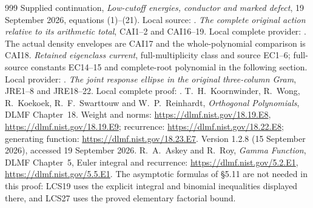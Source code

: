 \begin{thebibliography}{999}
 Supplied continuation,
\emph{Low-cutoff energies, conductor and marked defect},
19 September 2026, equations (1)--(21).
Local source: .
 \emph{The complete original action relative to its
arithmetic total}, CAI1--2 and CAI16--19. Local complete provider:
.
The actual density envelopes are CAI17 and the whole-polynomial
comparison is CAI18.
 \emph{Retained eigenclass current}, full-multiplicity
class and source EC1--6; full-source constants EC14--15 and
complete-root polynomial in the following section. Local provider:
.
 \emph{The joint response ellipse in the original
three-column Gram}, JRE1--8 and JRE18--22. Local complete proof:
.
 T.~H.~Koornwinder, R.~Wong, R.~Koekoek,
R.~F.~Swarttouw and W.~P.~Reinhardt,
\emph{Orthogonal Polynomials}, DLMF Chapter~18.
Weight and norms: \url{https://dlmf.nist.gov/18.19.E8},
\url{https://dlmf.nist.gov/18.19.E9}; recurrence:
\url{https://dlmf.nist.gov/18.22.E8}; generating function:
\url{https://dlmf.nist.gov/18.23.E7}.
Version 1.2.8 (15 September 2026), accessed 19 September 2026.
 R.~A.~Askey and R.~Roy,
\emph{Gamma Function}, DLMF Chapter~5, Euler integral and recurrence:
\url{https://dlmf.nist.gov/5.2.E1},
\url{https://dlmf.nist.gov/5.5.E1}.
The asymptotic formulas of \S5.11 are not needed in this proof:
LCS19 uses the explicit integral and binomial inequalities displayed
there, and LCS27 uses the proved elementary factorial bound.


\end{thebibliography}
